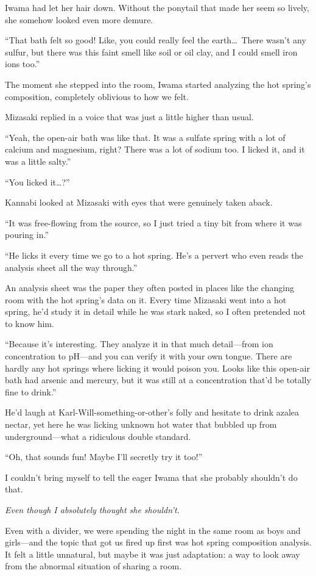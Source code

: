 \documentclass[
    a4paper,
    12pt,
    twoside,
    openany,
    UTF8,
    fontset=windows
]{ctexbook}
\begin{document}
Iwama had let her hair down. Without the ponytail that made her seem so lively, she somehow looked even more demure.

``That bath felt so good! Like, you could really feel the earth\dots\ There wasn't any sulfur, but there was this faint smell like soil or oil clay, and I could smell iron ions too.''

The moment she stepped into the room, Iwama started analyzing the hot spring's composition, completely oblivious to how we felt.

Mizasaki replied in a voice that was just a little higher than usual.

``Yeah, the open-air bath was like that. It was a sulfate spring with a lot of calcium and magnesium, right? There was a lot of sodium too. I licked it, and it was a little salty.''

``You licked it\dots?''

Kannabi looked at Mizasaki with eyes that were genuinely taken aback.

``It was free-flowing from the source, so I just tried a tiny bit from where it was pouring in.''

``He licks it every time we go to a hot spring. He's a pervert who even reads the analysis sheet all the way through.''

An analysis sheet was the paper they often posted in places like the changing room with the hot spring's data on it. Every time Mizasaki went into a hot spring, he'd study it in detail while he was stark naked, so I often pretended not to know him.

``Because it's interesting. They analyze it in that much detail---from ion concentration to pH---and you can verify it with your own tongue. There are hardly any hot springs where licking it would poison you. Looks like this open-air bath had arsenic and mercury, but it was still at a concentration that'd be totally fine to drink.''

He'd laugh at Karl-Will-something-or-other's folly and hesitate to drink azalea nectar, yet here he was licking unknown hot water that bubbled up from underground---what a ridiculous double standard.

``Oh, that sounds fun! Maybe I'll secretly try it too!''

I couldn't bring myself to tell the eager Iwama that she probably shouldn't do that.

\textit{Even though I absolutely thought she shouldn't.}

Even with a divider, we were spending the night in the same room as boys and girls---and the topic that got us fired up first was hot spring composition analysis. It felt a little unnatural, but maybe it was just adaptation: a way to look away from the abnormal situation of sharing a room.
\end{document}
